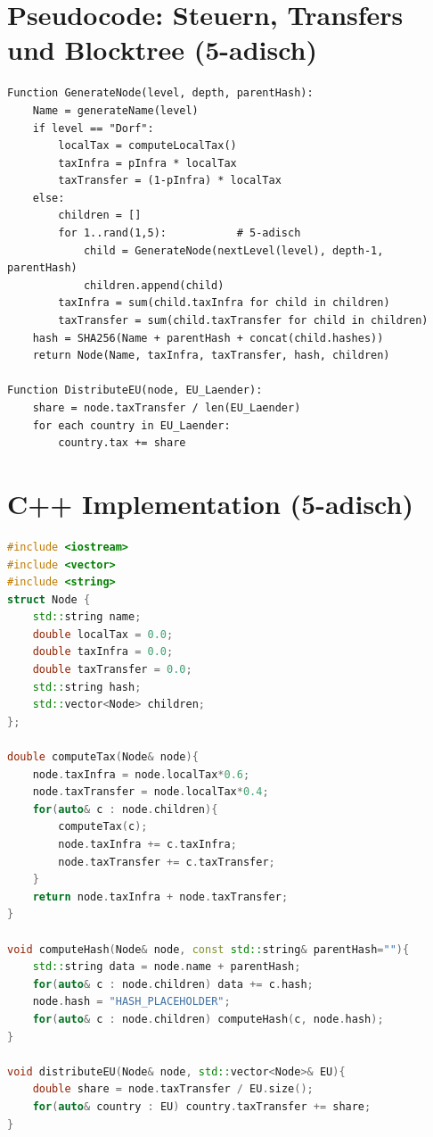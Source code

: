 \documentclass[a4paper,12pt]{article}
\begin{document}
\section{Pseudocode: Steuern, Transfers und Blocktree (5-adisch)}
\begin{verbatim}
Function GenerateNode(level, depth, parentHash):
    Name = generateName(level)
    if level == "Dorf":
        localTax = computeLocalTax()
        taxInfra = pInfra * localTax
        taxTransfer = (1-pInfra) * localTax
    else:
        children = []
        for 1..rand(1,5):           # 5-adisch
            child = GenerateNode(nextLevel(level), depth-1, parentHash)
            children.append(child)
        taxInfra = sum(child.taxInfra for child in children)
        taxTransfer = sum(child.taxTransfer for child in children)
    hash = SHA256(Name + parentHash + concat(child.hashes))
    return Node(Name, taxInfra, taxTransfer, hash, children)

Function DistributeEU(node, EU_Laender):
    share = node.taxTransfer / len(EU_Laender)
    for each country in EU_Laender:
        country.tax += share
\end{verbatim}

\section{C++ Implementation (5-adisch)}
\begin{lstlisting}[language=C++]
#include <iostream>
#include <vector>
#include <string>
struct Node {
    std::string name;
    double localTax = 0.0;
    double taxInfra = 0.0;
    double taxTransfer = 0.0;
    std::string hash;
    std::vector<Node> children;
};

double computeTax(Node& node){
    node.taxInfra = node.localTax*0.6;
    node.taxTransfer = node.localTax*0.4;
    for(auto& c : node.children){
        computeTax(c);
        node.taxInfra += c.taxInfra;
        node.taxTransfer += c.taxTransfer;
    }
    return node.taxInfra + node.taxTransfer;
}

void computeHash(Node& node, const std::string& parentHash=""){
    std::string data = node.name + parentHash;
    for(auto& c : node.children) data += c.hash;
    node.hash = "HASH_PLACEHOLDER";
    for(auto& c : node.children) computeHash(c, node.hash);
}

void distributeEU(Node& node, std::vector<Node>& EU){
    double share = node.taxTransfer / EU.size();
    for(auto& country : EU) country.taxTransfer += share;
}
\end{lstlisting}
\end{document}
